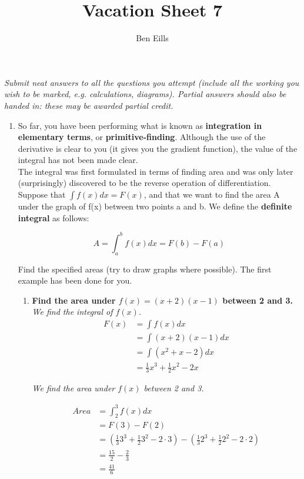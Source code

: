 \documentclass{article}
\begin{document}
\title{Vacation Sheet 7}
\author{Ben Eills}
\maketitle

\textit{Submit neat answers to all the questions you attempt (include all the working you wish to be marked, e.g. calculations, diagrams).  Partial answers should also be handed in: these may be awarded partial credit.}

\begin{enumerate}
	\item So far, you have been performing what is known as \textbf{integration in elementary terms}, or \textbf{primitive-finding}.  Although the use of the derivative is clear to you (it gives you the gradient function), the value of the integral has not been made clear. \\
	
	The integral was first formulated in terms of finding area and was only later (surprisingly) discovered to be the reverse operation of differentiation. \\
	
	Suppose that $\int f(x) dx = F(x)$, and that we want to find the area A under the graph of f(x) between two points a and b.  We define the \textbf{definite integral} as follows:
	
	$$A = \int_a^b f(x) dx = F(b) - F(a)$$
	
	
		Find the specified areas (try to draw graphs where possible).  The first example has been done for you.
	
		\begin{enumerate}
			\item \textbf{Find the area under $f(x) = (x+2)(x-1)$ between 2 and 3.} \\
			
					\textit{We find the integral of $f(x)$.}
					\begin{align*}
					F(x)		&= \int f(x) dx \\
								&= \int (x+2)(x-1) dx \\
								&= \int (x^2 + x - 2) dx \\
								&= \frac{1}{3}x^3 + \frac{1}{2}x^2 - 2x
					\end{align*}
					
					\newpage
					
					\textit{We find the area under $f(x)$ between 2 and 3.}
					
					\begin{align*}
					Area		&= \int_2^3 f(x) dx \\
								&= F(3) - F(2) \\
								&= (\frac{1}{3}3^3 + \frac{1}{2}3^2 - 2 \cdot 3) 
								- (\frac{1}{3}2^3 + \frac{1}{2}2^2 - 2 \cdot 2) \\
								&= \frac{15}{2} - \frac{2}{3} \\
								&= \frac{41}{6}						
					\end{align*}
					

\end{enumerate}
\end{enumerate}
\end{document}

